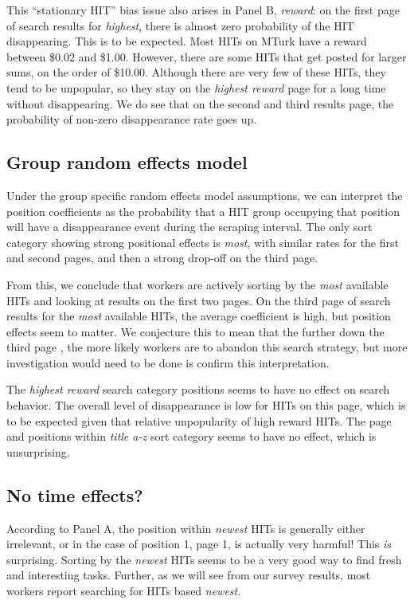 \documentclass{acm_proc_article-sp}
\begin{document}
This ``stationary HIT'' bias issue also arises in Panel B, {\em
  reward}: on the first page of search results for {\em highest},
there is almost zero probability of the HIT disappearing.  This is to
be expected.  Most HITs on MTurk have a reward between \$0.02 and
\$1.00.  However, there are some HITs that get posted for larger sums,
on the order of \$10.00.  Although there are very few of these HITs,
they tend to be unpopular, so they stay on the {\em highest reward}
page for a long time without disappearing.  We do see that on the
second and third results page, the probability of non-zero
disappearance rate goes up.

\subsection{Group random effects model} 
Under the group specific random effects model assumptions, we can
interpret the position coefficients as the probability that a HIT group
occupying that position will have a disappearance event during the
scraping interval. The only sort category showing strong positional
effects is {\em most}, with similar rates for the first and second
pages, and then a strong drop-off on the third page.

From this, we conclude that workers are actively sorting by the {\em
  most} available HITs and looking at results on the first two pages.
On the third page of search results for the {\em most} available HITs,
the average coefficient is high, but position effects seem to matter.
We conjecture this to mean that the further down the third page , the
more likely workers are to abandon this search strategy, but more
investigation would need to be done is confirm this interpretation.

The {\em highest reward} search category positions seems to have no
effect on search behavior. The overall level of disappearance is low
for HITs on this page, which is to be expected given that relative
unpopularity of high reward HITs. The page and positions within {\em
  title a-z} sort category seems to have no effect, which is
unsurprising.

\subsection{No time effects?}
According to Panel A, the position within {\em newest} HITs is
generally either irrelevant, or in the case of position 1, page 1, is
actually very harmful! This {\em is} surprising.  Sorting by the {\em
  newest} HITs seems to be a very good way to find fresh and
interesting tasks. Further, as we will see from our survey results,
most workers report searching for HITs based {\em newest}.
\end{document}
